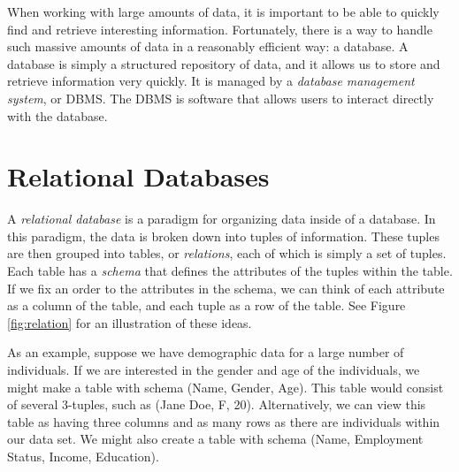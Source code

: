 \newcommand{\lsql}[1]{\lstinline[language=SQL,prebreak=]!#1!}

\label{lab:sql_rdb}

When working with large amounts of data, it is important to be able to quickly find and retrieve interesting information.
Fortunately, there is a way to handle such massive amounts of data in a reasonably efficient way: a database.
A database is simply a structured repository of data, and it allows us to store and retrieve information very quickly.
It is managed by a \emph{database management system}, or DBMS.
The DBMS is software that allows users to interact directly with the database.

\section*{Relational Databases}
A \emph{relational database} is a paradigm for organizing data inside of a database.
In this paradigm, the data is broken down into tuples of information.
These tuples are then grouped into tables, or \emph{relations}, each of which is simply a set of tuples.
Each table has a \emph{schema} that defines the attributes of the tuples within the table.
If we fix an order to the attributes in the schema, we can think of each attribute as a column
of the table, and each tuple as a row of the table. See Figure \ref{fig:relation} for an illustration of
these ideas.

As an example, suppose we have demographic data for a large number of individuals.
If we are interested in the gender and age of the individuals, we might make a table
with schema (Name, Gender, Age). This table would consist of several 3-tuples, such as
(Jane Doe, F, 20). Alternatively, we can view this table as having three columns
and as many rows as there are individuals within our data set.
We might also create a table with schema (Name, Employment Status, Income, Education).


